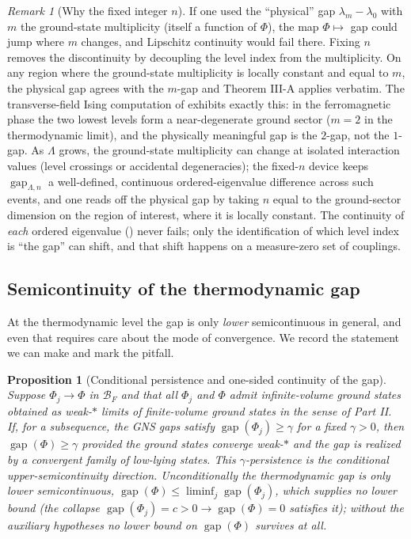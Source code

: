 \documentclass[12pt]{article}
\newcommand{\BF}{\mathcal{B}_{F}}              %
\newcommand{\gapof}[1]{\operatorname{gap}(#1)} %
\newcommand{\gapfin}[1]{\operatorname{gap}_{#1}}
\theoremstyle{plain}
\newtheorem{proposition}[proposition]{Proposition}
\theoremstyle{definition}
\theoremstyle{remark}
\newtheorem{remark}[remark]{Remark}
\begin{document}
\begin{remark}[Why the fixed integer $n$]
\label{rem:why-n}
If one used the ``physical'' gap $\lambda_m-\lambda_0$ with $m$ the ground-state
multiplicity (itself a function of $\Phi$), the map $\Phi\mapsto$ gap could jump
where $m$ changes, and Lipschitz continuity would fail there. Fixing $n$ removes the
discontinuity by decoupling the level index from the multiplicity. On any region
where the ground-state multiplicity is locally constant and equal to $m$, the
physical gap agrees with the $m$-gap and Theorem III-A applies verbatim. The
transverse-field Ising computation of  exhibits exactly this: in
the ferromagnetic phase the two lowest levels form a near-degenerate ground sector
($m=2$ in the thermodynamic limit), and the physically meaningful gap is the $2$-gap,
not the $1$-gap. As $\Lambda$ grows, the ground-state multiplicity can change at
isolated interaction values (level crossings or accidental degeneracies); the
fixed-$n$ device keeps $\gapfin{\Lambda,n}$ a well-defined, continuous
ordered-eigenvalue difference across such events, and one reads off the physical gap
by taking $n$ equal to the ground-sector dimension on the region of interest, where it
is locally constant. The continuity of \emph{each} ordered eigenvalue ()
never fails; only the identification of which level index is ``the gap'' can shift, and
that shift happens on a measure-zero set of couplings.
\end{remark}

\subsection{Semicontinuity of the thermodynamic gap}
\label{sec:finite-semicont}

At the thermodynamic level the gap is only \emph{lower} semicontinuous in general,
and even that requires care about the mode of convergence. We record the statement we
can make and mark the pitfall.

\begin{proposition}[Conditional persistence and one-sided continuity of the gap]
\label{prop:lsc}
Suppose $\Phi_j\to\Phi$ in $\BF$ and that all $\Phi_j$ and $\Phi$ admit
infinite-volume ground states obtained as weak-$*$ limits of finite-volume ground
states in the sense of Part II\@. If, for a subsequence, the GNS gaps satisfy
$\gapof{\Phi_j}\ge\gamma$ for a fixed $\gamma>0$, then $\gapof{\Phi}\ge\gamma$
provided the ground states converge weak-$*$ and the gap is realized by a convergent
family of low-lying states. This $\gamma$-persistence is the conditional
\emph{upper}-semicontinuity direction. Unconditionally the thermodynamic gap is only
\emph{lower} semicontinuous, $\gapof{\Phi}\le\liminf_j\gapof{\Phi_j}$, which supplies
no lower bound (the collapse $\gapof{\Phi_j}=c>0\to\gapof{\Phi}=0$ satisfies it);
without the auxiliary hypotheses no lower bound on $\gapof{\Phi}$ survives at all.
\end{proposition}
\end{document}
